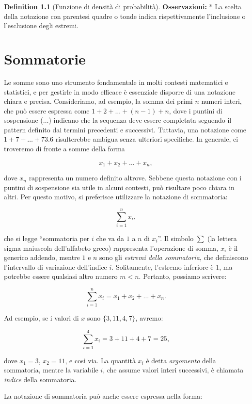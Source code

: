 \documentclass[
  letterpaper,
  DIV=11,
  numbers=noendperiod,
  oneside]{scrreprt}
\theoremstyle{definition}
\theoremstyle{plain}
\theoremstyle{definition}
\newtheorem{definition}{Definition}[chapter]
\theoremstyle{remark}
\begin{document}
\begin{definition}[Funzione di densità di
probabilità]
\textbf{Osservazioni:} * La scelta della notazione con parentesi quadre
o tonde indica rispettivamente l'inclusione o l'esclusione degli
estremi.

\chapter{Sommatorie}\label{sec-apx-sums}

Le somme sono uno strumento fondamentale in molti contesti matematici e
statistici, e per gestirle in modo efficace è essenziale disporre di una
notazione chiara e precisa. Consideriamo, ad esempio, la somma dei primi
\(n\) numeri interi, che può essere espressa come
\(1 + 2 + \dots + (n-1) + n\), dove i puntini di sospensione (\(\dots\))
indicano che la sequenza deve essere completata seguendo il pattern
definito dai termini precedenti e successivi. Tuttavia, una notazione
come \(1 + 7 + \dots + 73.6\) risulterebbe ambigua senza ulteriori
specifiche. In generale, ci troveremo di fronte a somme della forma

\[
x_1 + x_2 + \dots + x_n,
\]

dove \(x_n\) rappresenta un numero definito altrove. Sebbene questa
notazione con i puntini di sospensione sia utile in alcuni contesti, può
risultare poco chiara in altri. Per questo motivo, si preferisce
utilizzare la notazione di sommatoria:

\[
\sum_{i=1}^n x_i,
\]

che si legge ``sommatoria per \(i\) che va da \(1\) a \(n\) di
\(x_i\)''. Il simbolo \(\sum\) (la lettera sigma maiuscola dell'alfabeto
greco) rappresenta l'operazione di somma, \(x_i\) è il generico addendo,
mentre \(1\) e \(n\) sono gli \emph{estremi della sommatoria}, che
definiscono l'intervallo di variazione dell'indice \(i\). Solitamente,
l'estremo inferiore è \(1\), ma potrebbe essere qualsiasi altro numero
\(m < n\). Pertanto, possiamo scrivere:

\[
\sum_{i=1}^n x_i = x_1 + x_2 + \dots + x_n.
\]

Ad esempio, se i valori di \(x\) sono \(\{3, 11, 4, 7\}\), avremo:

\[
\sum_{i=1}^4 x_i = 3 + 11 + 4 + 7 = 25,
\]

dove \(x_1 = 3\), \(x_2 = 11\), e così via. La quantità \(x_i\) è detta
\emph{argomento} della sommatoria, mentre la variabile \(i\), che assume
valori interi successivi, è chiamata \emph{indice} della sommatoria.

La notazione di sommatoria può anche essere espressa nella forma:


\end{definition}
\end{document}
